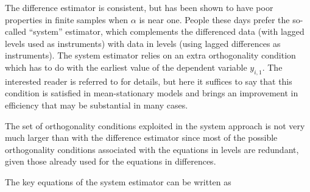 The difference estimator is consistent, but has been shown to have
poor properties in finite samples when $\alpha$ is near one. People
these days prefer the so-called ``system'' estimator, which
complements the differenced data (with lagged levels used as
instruments) with data in levels (using lagged differences as
instruments). The system estimator relies on an extra orthogonality
condition which has to do with the earliest value of the dependent
variable $y_{i,1}$. The interested reader is referred to \citet[pp.\
124--125]{blundell-bond98} for details, but here it suffices to say
that this condition is satisfied in mean-stationary models and brings
an improvement in efficiency that may be substantial in many cases.

The set of orthogonality conditions exploited in the system approach
is not very much larger than with the difference estimator since most
of the possible orthogonality conditions associated with the equations
in levels are redundant, given those already used for the equations in
differences.

The key equations of the system estimator can be written as

